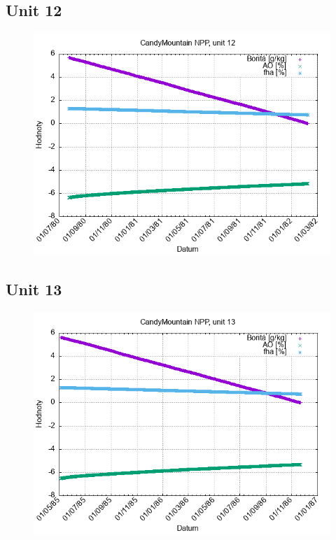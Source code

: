 \documentclass{article}
\begin{document}
\subsection*{Unit 12}
\begin{figure}[h!]
\centering
\includegraphics[width=14cm]{./grafy/CandyMountain12.png}
\end{figure}
\clearpage
\subsection*{Unit 13}
\begin{figure}[h!]
\centering
\includegraphics[width=14cm]{./grafy/CandyMountain13.png}
\end{figure}
\clearpage
\end{document}
